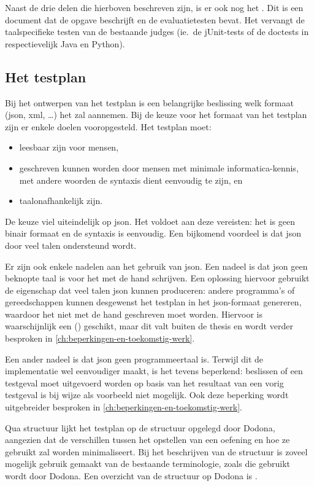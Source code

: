 Naast de drie delen die hierboven beschreven zijn, is er ook nog het .
Dit is een document dat de opgave beschrijft en de evaluatietesten bevat.
Het vervangt de taalspecifieke testen van de bestaande judges (ie.\ de jUnit-tests of de doctests in respectievelijk Java en Python).

\subsection{Het testplan}\label{subsec:het-testplan}

Bij het ontwerpen van het testplan is een belangrijke beslissing welk formaat (json, xml, \ldots) het zal aannemen.
Bij de keuze voor het formaat van het testplan zijn er enkele doelen vooropgesteld.
Het testplan moet:

\begin{itemize}
    \item leesbaar zijn voor mensen,
    \item geschreven kunnen worden door mensen met minimale informatica-kennis, met andere woorden de syntaxis dient eenvoudig te zijn, en
    \item taalonafhankelijk zijn.
\end{itemize}

De keuze viel uiteindelijk op json.
Het voldoet aan deze vereisten: het is geen binair formaat en de syntaxis is eenvoudig.
Een bijkomend voordeel is dat json door veel talen ondersteund wordt.

Er zijn ook enkele nadelen aan het gebruik van json.
Een nadeel is dat json geen beknopte taal is voor het met de hand schrijven.
Een oplossing hiervoor gebruikt de eigenschap dat veel talen json kunnen produceren: andere programma's of gereedschappen kunnen desgewenst het testplan in het json-formaat genereren, waardoor het niet met de hand geschreven moet worden.
Hiervoor is waarschijnlijk een  () geschikt, maar dit valt buiten de thesis en wordt verder besproken in \cref{ch:beperkingen-en-toekomstig-werk}.

Een ander nadeel is dat json geen programmeertaal is.
Terwijl dit de implementatie wel eenvoudiger maakt, is het tevens beperkend: beslissen of een testgeval moet uitgevoerd worden op basis van het resultaat van een vorig testgeval is bij wijze als voorbeeld niet mogelijk.
Ook deze beperking wordt uitgebreider besproken in \cref{ch:beperkingen-en-toekomstig-werk}.

Qua structuur lijkt het testplan op de structuur opgelegd door Dodona, aangezien dat de verschillen tussen het opstellen van een oefening en hoe ze gebruikt zal worden minimaliseert.
Bij het beschrijven van de structuur is zoveel mogelijk gebruik gemaakt van de bestaande terminologie, zoals die gebruikt wordt door Dodona.
Een overzicht van de structuur op Dodona is \autocite{dodona2020}.

